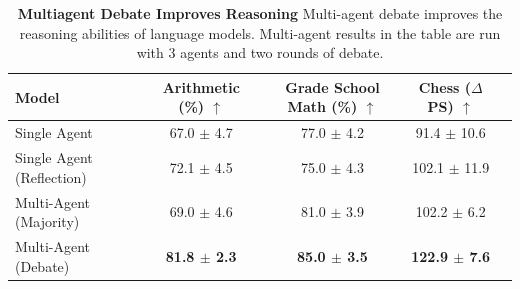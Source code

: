 \begin{table}[t]
\small\setlength{\tabcolsep}{5.5pt}
\centering
\begin{tabular}{lcccc}
      {\bf Model} & {\bf Arithmetic (\%) $\uparrow$} & {\bf Grade School Math (\%) $\uparrow$} & {\bf Chess ($\Delta$PS) $\uparrow$} \\
      \midrule
      Single Agent & 67.0 $\pm$ 4.7 & 77.0 $\pm$ 4.2 & 91.4  $\pm$ 10.6 \\
      Single Agent (Reflection) & 72.1 $\pm$ 4.5 & 75.0 $\pm$ 4.3 & 102.1 $\pm$ 11.9  \\
      Multi-Agent (Majority) & 69.0 $\pm$ 4.6   & 81.0 $\pm$ 3.9 & 102.2 $\pm$ 6.2 \\
      Multi-Agent (Debate) & \textbf{81.8 $\pm$ 2.3} & \textbf{85.0 $\pm$ 3.5}  & \textbf{122.9 $\pm$ 7.6} \\
    \bottomrule
\end{tabular}
\caption{\small \textbf{Multiagent Debate Improves Reasoning}  Multi-agent debate improves the reasoning abilities of language models. Multi-agent results in the table are run with 3 agents and two rounds of debate.}
\label{tbl:reasoning}
\vspace{-15pt}
\end{table}